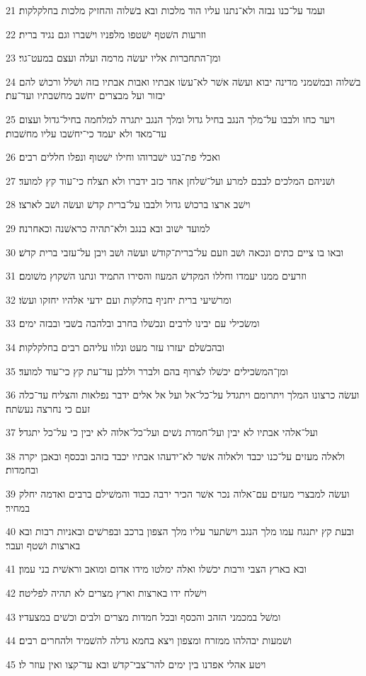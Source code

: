 \par 21 ועמד על־כנו נבזה ולא־נתנו עליו הוד מלכות ובא בשׁלוה והחזיק מלכות בחלקלקות׃
\par 22 וזרעות השׁטף ישׁטפו מלפניו וישׁברו וגם נגיד ברית׃
\par 23 ומן־התחברות אליו יעשׂה מרמה ועלה ועצם במעט־גוי׃
\par 24 בשׁלוה ובמשׁמני מדינה יבוא ועשׂה אשׁר לא־עשׂו אבתיו ואבות אבתיו בזה ושׁלל ורכושׁ להם יבזור ועל מבצרים יחשׁב מחשׁבתיו ועד־עת׃
\par 25 ויער כחו ולבבו על־מלך הנגב בחיל גדול ומלך הנגב יתגרה למלחמה בחיל־גדול ועצום עד־מאד ולא יעמד כי־יחשׁבו עליו מחשׁבות׃
\par 26 ואכלי פת־בגו ישׁברוהו וחילו ישׁטוף ונפלו חללים רבים׃
\par 27 ושׁניהם המלכים לבבם למרע ועל־שׁלחן אחד כזב ידברו ולא תצלח כי־עוד קץ למועד׃
\par 28 וישׁב ארצו ברכושׁ גדול ולבבו על־ברית קדשׁ ועשׂה ושׁב לארצו׃
\par 29 למועד ישׁוב ובא בנגב ולא־תהיה כראשׁנה וכאחרנה׃
\par 30 ובאו בו ציים כתים ונכאה ושׁב וזעם על־ברית־קודשׁ ועשׂה ושׁב ויבן על־עזבי ברית קדשׁ׃
\par 31 וזרעים ממנו יעמדו וחללו המקדשׁ המעוז והסירו התמיד ונתנו השׁקוץ משׁומם׃
\par 32 ומרשׁיעי ברית יחניף בחלקות ועם ידעי אלהיו יחזקו ועשׂו׃
\par 33 ומשׂכילי עם יבינו לרבים ונכשׁלו בחרב ובלהבה בשׁבי ובבזה ימים׃
\par 34 ובהכשׁלם יעזרו עזר מעט ונלוו עליהם רבים בחלקלקות׃
\par 35 ומן־המשׂכילים יכשׁלו לצרוף בהם ולברר וללבן עד־עת קץ כי־עוד למועד׃
\par 36 ועשׂה כרצונו המלך ויתרומם ויתגדל על־כל־אל ועל אל אלים ידבר נפלאות והצליח עד־כלה זעם כי נחרצה נעשׂתה׃
\par 37 ועל־אלהי אבתיו לא יבין ועל־חמדת נשׁים ועל־כל־אלוה לא יבין כי על־כל יתגדל׃
\par 38 ולאלה מעזים על־כנו יכבד ולאלוה אשׁר לא־ידעהו אבתיו יכבד בזהב ובכסף ובאבן יקרה ובחמדות׃
\par 39 ועשׂה למבצרי מעזים עם־אלוה נכר אשׁר הכיר ירבה כבוד והמשׁילם ברבים ואדמה יחלק במחיר׃
\par 40 ובעת קץ יתנגח עמו מלך הנגב וישׂתער עליו מלך הצפון ברכב ובפרשׁים ובאניות רבות ובא בארצות ושׁטף ועבר׃
\par 41 ובא בארץ הצבי ורבות יכשׁלו ואלה ימלטו מידו אדום ומואב וראשׁית בני עמון׃
\par 42 וישׁלח ידו בארצות וארץ מצרים לא תהיה לפליטה׃
\par 43 ומשׁל במכמני הזהב והכסף ובכל חמדות מצרים ולבים וכשׁים במצעדיו׃
\par 44 ושׁמעות יבהלהו ממזרח ומצפון ויצא בחמא גדלה להשׁמיד ולהחרים רבים׃
\par 45 ויטע אהלי אפדנו בין ימים להר־צבי־קדשׁ ובא עד־קצו ואין עוזר לו׃

